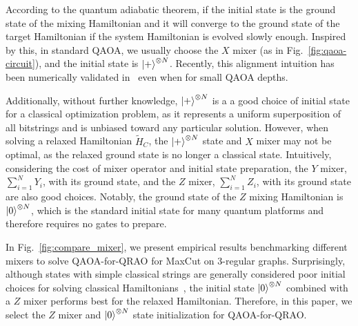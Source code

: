 \documentclass[conference,10pt]{IEEEtran}
\newcommand{\QAOAQRAO}{QAOA-for-QRAO}
\begin{document}
According to the quantum adiabatic theorem, if the initial state is the ground state of the mixing Hamiltonian and it will converge to the ground state of the target Hamiltonian if the system Hamiltonian is evolved slowly enough. Inspired by this, in standard QAOA, we usually choose the $X$ mixer (as in Fig.~\ref{fig:qaoa-circuit}), and the initial state is $\ket{+}^{\otimes N}$. Recently, this alignment intuition has been numerically validated in~\cite{he2023alignment} even when for small QAOA depths. 

Additionally, without further knowledge, $\ket{+}^{\otimes N}$ is a a good choice of initial state for a classical optimization problem, as it represents a uniform superposition of all bitstrings and is unbiased toward any particular solution. However, when solving a relaxed Hamiltonian $\tilde{H}_C$, the $\ket{+}^{\otimes N}$ state and $X$ mixer may not be optimal, as the relaxed ground state is no longer a classical state. Intuitively, considering the cost of mixer operator and initial state preparation, the $Y$ mixer, $\sum_{i=1}^N Y_i$, with its ground state, and the $Z$ mixer, $\sum_{i=1}^N Z_i$, with its ground state are also good choices. Notably, the ground state of the $Z$ mixing Hamiltonian is $\ket{0}^{\otimes N}$, which is the standard initial state for many quantum platforms and therefore requires no gates to prepare. %

In Fig.~\ref{fig:compare_mixer}, we present empirical results benchmarking different mixers to solve \QAOAQRAO{} for MaxCut on 3-regular graphs. Surprisingly, although states with simple classical strings are generally considered poor initial choices for solving classical Hamiltonians~\cite{cain2022qaoa}, the initial state $\ket{0}^{\otimes N}$ combined with a $Z$ mixer performs best for the relaxed Hamiltonian. Therefore, in this paper, we select the $Z$ mixer and $\ket{0}^{\otimes N}$ state initialization for \QAOAQRAO{}.
\end{document}
